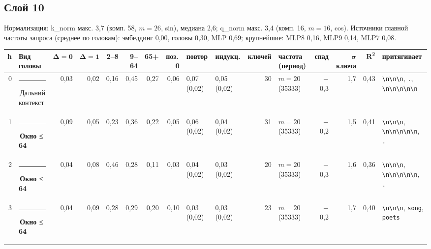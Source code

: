 \documentclass[10pt]{article}
\begin{document}
\noindent\begin{minipage}{\linewidth}
\subsection*{Слой 10}
{\small\color{ink2} Нормализация: k\_norm макс. 3,7 (комп. 58, $m{=}26$, sin), медиана 2,6; q\_norm макс. 3,4 (комп. 16, $m{=}16$, cos). Источники главной частоты запроса (среднее по головам): эмбеддинг 0,00, головы 0,30, MLP 0,69; крупнейшие: MLP8 0,16, MLP9 0,14, MLP7 0,08.}
\begin{center}{\footnotesize\begin{tabular}{|r|l|r|r|r|r|r|r|l|l|r|l|r|r|r|l|}
\hline
\rowcolor{head}\textbf{h} & \textbf{Вид головы} & $\boldsymbol{\Delta{=}0}$ & $\boldsymbol{\Delta{=}1}$ & \textbf{2–8} & \textbf{9–64} & \textbf{65+} & \textbf{поз.\,0} & \textbf{повтор} & \textbf{индукц.} & \textbf{ключей} & \textbf{частота (период)} & \textbf{спад} & $\boldsymbol{\sigma}$ \textbf{ключа} & $\boldsymbol{R^2}$ & \textbf{притягивает} \\ \hline
0 & \textcolor[HTML]{C3C2B7}{\rule{0.62em}{0.62em}}\,Дальний контекст & 0,03 & 0,02 & 0,16 & 0,45 & 0,27 & 0,06 & 0,07 (0,02) & 0,05 (0,02) & 30 & $m{=}20$ (35333) & $-$0,3 & 1,7 & 0,43 & \texttt{\textvisiblespace{}\textbackslash{}n\textbackslash{}n\textbackslash{}n}, \texttt{\textvisiblespace{}.}, \texttt{\textbackslash{}n\textbackslash{}n\textbackslash{}n\textbackslash{}n\textbackslash{}n} \\ \hline
1 & \textcolor[HTML]{EDA100}{\rule{0.62em}{0.62em}}\,\textbf{Окно ≤ 64} & 0,09 & 0,05 & 0,23 & 0,36 & 0,22 & 0,05 & 0,06 (0,02) & 0,04 (0,02) & 31 & $m{=}20$ (35333) & $-$0,2 & 1,5 & 0,41 & \texttt{\textvisiblespace{}\textbackslash{}n\textbackslash{}n\textbackslash{}n}, \texttt{\textbackslash{}n\textbackslash{}n\textbackslash{}n\textbackslash{}n\textbackslash{}n}, \texttt{\textvisiblespace{}.} \\ \hline
2 & \textcolor[HTML]{EDA100}{\rule{0.62em}{0.62em}}\,\textbf{Окно ≤ 64} & 0,04 & 0,08 & 0,46 & 0,28 & 0,11 & 0,03 & 0,04 (0,02) & 0,03 (0,02) & 20 & $m{=}20$ (35333) & $-$0,3 & 1,6 & 0,36 & \texttt{\textvisiblespace{}\textbackslash{}n\textbackslash{}n\textbackslash{}n}, \texttt{\textbackslash{}n\textbackslash{}n\textbackslash{}n\textbackslash{}n\textbackslash{}n}, \texttt{\textvisiblespace{}.} \\ \hline
3 & \textcolor[HTML]{EDA100}{\rule{0.62em}{0.62em}}\,\textbf{Окно ≤ 64} & 0,04 & 0,09 & 0,28 & 0,29 & 0,20 & 0,10 & 0,03 (0,02) & 0,03 (0,02) & 23 & $m{=}20$ (35333) & $-$0,2 & 1,7 & 0,40 & \texttt{\textvisiblespace{}\textbackslash{}n\textbackslash{}n\textbackslash{}n}, \texttt{\textvisiblespace{}song}, \texttt{\textvisiblespace{}poets} \\ \hline

\end{tabular}}
\end{center}
\end{minipage}
\end{document}
